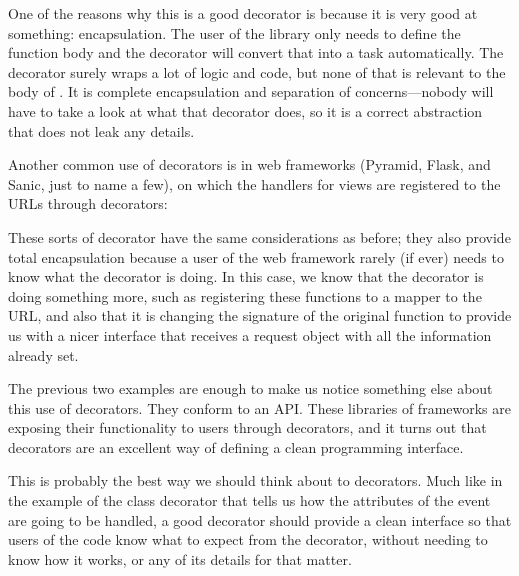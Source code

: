 \documentclass[a4paper,10pt,english]{sphinxmanual}
\begin{document}
One of the reasons why this is a good decorator is because it is very good at
something: encapsulation. The user of the library only needs to define the function body
and the decorator will convert that into a task automatically. The  decorator
surely wraps a lot of logic and code, but none of that is relevant to the body of
 . It is complete encapsulation and separation of concerns—nobody will have to
take a look at what that decorator does, so it is a correct abstraction that does not leak any
details.

Another common use of decorators is in web frameworks (Pyramid, Flask, and Sanic, just
to name a few), on which the handlers for views are registered to the URLs through
decorators:

\begin{sphinxVerbatim}[commandchars=\\\{\}]
 \PYG{p}{[}\PYG{p}{]}
 
\end{sphinxVerbatim}

These sorts of decorator have the same considerations as before; they also provide total
encapsulation because a user of the web framework rarely (if ever) needs to know what
the  decorator is doing. In this case, we know that the decorator is doing
something more, such as registering these functions to a mapper to the URL, and also that it
is changing the signature of the original function to provide us with a nicer interface that
receives a request object with all the information already set.

The previous two examples are enough to make us notice something else about this use of
decorators. They conform to an API. These libraries of frameworks are exposing their
functionality to users through decorators, and it turns out that decorators are an excellent
way of defining a clean programming interface.

This is probably the best way we should think about to decorators. Much like in the
example of the class decorator that tells us how the attributes of the event are going to be
handled, a good decorator should provide a clean interface so that users of the code know
what to expect from the decorator, without needing to know how it works, or any of its
details for that matter.
\end{document}
